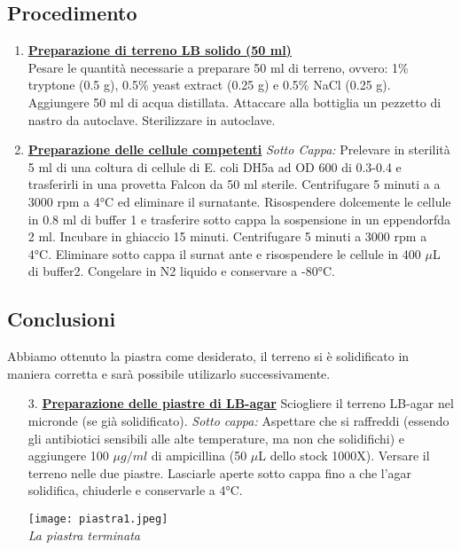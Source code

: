\documentclass{extarticle}
\begin{document}
\subsection*{Procedimento}
\begin{minipage}{0.5\textwidth}
\begin{enumerate}
    \item \underline{\textbf{Preparazione di terreno LB solido (50 ml)}}\\
    Pesare le quantità necessarie a preparare 50 ml di terreno, ovvero: 1\% tryptone (0.5 g), 0.5\% yeast extract (0.25 g) e 0.5\% NaCl (0.25 g). Aggiungere 50 ml di
    acqua distillata.
     Attaccare alla bottiglia un pezzetto di nastro da autoclave.
     Sterilizzare in autoclave.
    \item \underline{\textbf{Preparazione delle cellule competenti}}
     \textit{Sotto Cappa:} Prelevare in sterilità 5 ml di una coltura di cellule di E. coli DH5a ad OD 600 di 0.3-0.4 e trasferirli in una provetta Falcon da 50 ml sterile.
     Centrifugare 5 minuti a a 3000 rpm a 4°C ed eliminare il surnatante.
     Risospendere dolcemente le cellule in 0.8 ml di buffer 1 e trasferire sotto cappa la sospensione in un eppendorfda 2 ml.
     Incubare in ghiaccio 15 minuti.
     Centrifugare 5 minuti a 3000 rpm a 4°C.
     Eliminare sotto cappa il surnat ante e risospendere le cellule in 400  $\mu$L  di buffer2.
     Congelare in N2 liquido e conservare a -80°C.
    \end{enumerate}
    \subsection*{Conclusioni} Abbiamo ottenuto la piastra come desiderato, il terreno si è solidificato in maniera corretta e sarà possibile utilizarlo successivamente.
\end{minipage} \hfill
\begin{minipage}{0.50\textwidth} 
    \begin{enumerate}
    \item[3.]\underline{\textbf{Preparazione delle piastre di LB-agar}}
     Sciogliere il terreno LB-agar nel micronde (se già solidificato).
     \textit{Sotto cappa:} Aspettare che si raffreddi (essendo gli antibiotici sensibili alle alte temperature, ma non che solidifichi) e aggiungere 100 $\mu g/ml$ di ampicillina (50 $\mu$L dello stock 1000X). 
     Versare il terreno nelle due piastre.
     Lasciarle aperte sotto cappa fino a che l'agar solidifica, chiuderle e conservarle a 4°C.
    \begin{center}
        \texttt{[image: piastra1.jpeg]}\\
        \emph{La piastra terminata}
    \end{center}
\end{enumerate}
\end{minipage}
\end{document}
